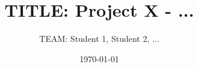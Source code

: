 \documentclass[a4paper]{DPSbachelor}
\title{TITLE: Project X - ...}
\author{TEAM: Student 1, Student 2, ...}
\date{\today}
\begin{document}
  \maketitle

	\abstract{}

  \tableofcontents
  \listoffigures
  \listoftables

  
  
  
  
  


  
\end{document}
